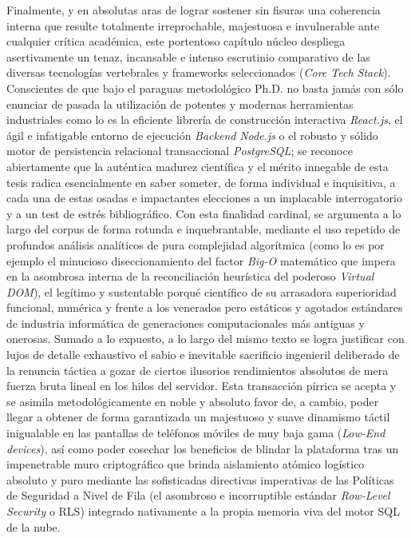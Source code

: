 Finalmente, y en absolutas aras de lograr sostener sin fisuras una coherencia interna que resulte totalmente irreprochable, majestuosa e invulnerable ante cualquier crítica académica, este portentoso capítulo núcleo despliega asertivamente un tenaz, incansable e intenso escrutinio comparativo de las diversas tecnologías vertebrales y frameworks seleccionados (\textit{Core Tech Stack}). Conscientes de que bajo el paraguas metodológico Ph.D. no basta jamás con sólo enunciar de pasada la utilización de potentes y modernas herramientas industriales como lo es la eficiente librería de construcción interactiva \textit{React.js}, el ágil e infatigable entorno de ejecución \textit{Backend} \textit{Node.js} o el robusto y sólido motor de persistencia relacional transaccional \textit{PostgreSQL}; se reconoce abiertamente que la auténtica madurez científica y el mérito innegable de esta tesis radica esencialmente en saber someter, de forma individual e inquisitiva, a cada una de estas osadas e impactantes elecciones a un implacable interrogatorio y a un test de estrés bibliográfico. Con esta finalidad cardinal, se argumenta a lo largo del corpus de forma rotunda e inquebrantable, mediante el uso repetido de profundos análisis analíticos de pura complejidad algorítmica (como lo es por ejemplo el minucioso diseccionamiento del factor \textit{Big-O} matemático que impera en la asombrosa interna de la reconciliación heurística del poderoso \textit{Virtual DOM}), el legítimo y sustentable porqué científico de su arrasadora superioridad funcional, numérica y frente a los venerados pero estáticos y agotados estándares de industria informática de generaciones computacionales más antiguas y onerosas. Sumado a lo expuesto, a lo largo del mismo texto se logra justificar con lujos de detalle exhaustivo el sabio e inevitable sacrificio ingenieril deliberado de la renuncia táctica a gozar de ciertos ilusorios rendimientos absolutos de mera fuerza bruta lineal en los hilos del servidor. Esta transacción pírrica se acepta y se asimila metodológicamente en noble y absoluto favor de, a cambio, poder llegar a obtener de forma garantizada un majestuoso y suave dinamismo táctil inigualable en las pantallas de teléfonos móviles de muy baja gama (\textit{Low-End devices}), así como poder cosechar los beneficios de blindar la plataforma tras un impenetrable muro criptográfico que brinda aislamiento atómico logístico absoluto y puro mediante las sofisticadas directivas imperativas de las Políticas de Seguridad a Nivel de Fila (el asombroso e incorruptible estándar \textit{Row-Level Security} o RLS) integrado nativamente a la propia memoria viva del motor SQL de la nube. 

